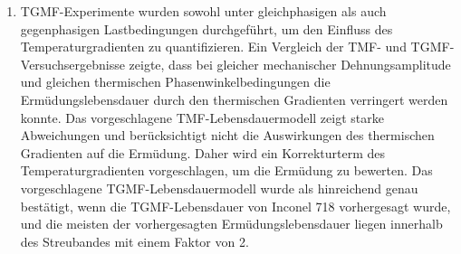 \begin{enumerate}
\item TGMF-Experimente wurden sowohl unter gleichphasigen als auch gegenphasigen Lastbedingungen durchgeführt, um den Einfluss des Temperaturgradienten zu quantifizieren. Ein Vergleich der TMF- und TGMF-Versuchsergebnisse zeigte, dass bei gleicher mechanischer Dehnungsamplitude und gleichen thermischen Phasenwinkelbedingungen die Ermüdungslebensdauer durch den thermischen Gradienten verringert werden konnte. Das vorgeschlagene TMF-Lebensdauermodell zeigt starke Abweichungen und berücksichtigt nicht die Auswirkungen des thermischen Gradienten auf die Ermüdung. Daher wird ein Korrekturterm des Temperaturgradienten vorgeschlagen, um die Ermüdung zu bewerten. Das vorgeschlagene TGMF-Lebensdauermodell wurde als hinreichend genau bestätigt, wenn die TGMF-Lebensdauer von Inconel 718 vorhergesagt wurde, und die meisten der vorhergesagten Ermüdungslebensdauer liegen innerhalb des Streubandes mit einem Faktor von 2.
\end{enumerate}



